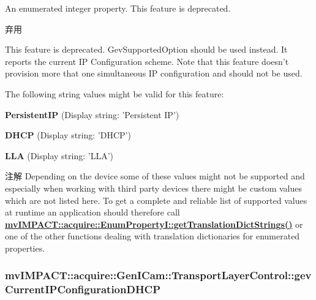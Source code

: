An enumerated integer property. This feature is deprecated. 

\begin{DoxyRefDesc}{弃用}
\item[\hyperlink{deprecated__deprecated000066}{弃用}]This feature is deprecated. Gev\+Supported\+Option should be used instead. It reports the current I\+P Configuration scheme. Note that this feature doesn't provision more that one simultaneous I\+P configuration and should not be used.\end{DoxyRefDesc}


The following string values might be valid for this feature\+:
\begin{DoxyItemize}
\item {\bfseries Persistent\+I\+P} (Display string\+: 'Persistent I\+P')
\item {\bfseries D\+H\+C\+P} (Display string\+: 'D\+H\+C\+P')
\item {\bfseries L\+L\+A} (Display string\+: 'L\+L\+A')
\end{DoxyItemize}

\begin{DoxyNote}{注解}
Depending on the device some of these values might not be supported and especially when working with third party devices there might be custom values which are not listed here. To get a complete and reliable list of supported values at runtime an application should therefore call {\bfseries \hyperlink{classmv_i_m_p_a_c_t_1_1acquire_1_1_enum_property_i_a0ba6ccbf5ee69784d5d0b537924d26b6}{mv\+I\+M\+P\+A\+C\+T\+::acquire\+::\+Enum\+Property\+I\+::get\+Translation\+Dict\+Strings()}} or one of the other functions dealing with translation dictionaries for enumerated properties. 
\end{DoxyNote}
\hypertarget{classmv_i_m_p_a_c_t_1_1acquire_1_1_gen_i_cam_1_1_transport_layer_control_a0c4ccf260567a6cec39600933ba36a81}{
\subsubsection[{gev\+Current\+I\+P\+Configuration\+D\+H\+C\+P}]{ mv\+I\+M\+P\+A\+C\+T\+::acquire\+::\+Gen\+I\+Cam\+::\+Transport\+Layer\+Control\+::gev\+Current\+I\+P\+Configuration\+D\+H\+C\+P}}\label{classmv_i_m_p_a_c_t_1_1acquire_1_1_gen_i_cam_1_1_transport_layer_control_a0c4ccf260567a6cec39600933ba36a81}


